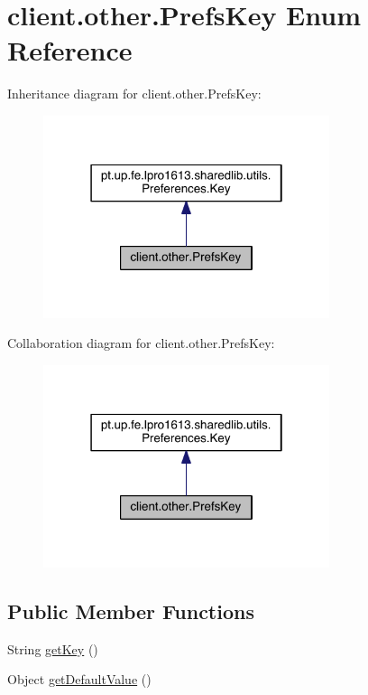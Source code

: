 \hypertarget{enumclient_1_1other_1_1_prefs_key}{}\section{client.\+other.\+Prefs\+Key Enum Reference}
\label{enumclient_1_1other_1_1_prefs_key}


Inheritance diagram for client.\+other.\+Prefs\+Key\+:
\nopagebreak
\begin{figure}[H]
\begin{center}
\leavevmode
\includegraphics[width=238pt]{enumclient_1_1other_1_1_prefs_key__inherit__graph}
\end{center}
\end{figure}


Collaboration diagram for client.\+other.\+Prefs\+Key\+:
\nopagebreak
\begin{figure}[H]
\begin{center}
\leavevmode
\includegraphics[width=238pt]{enumclient_1_1other_1_1_prefs_key__coll__graph}
\end{center}
\end{figure}
\subsection*{Public Member Functions}
\begin{DoxyCompactItemize}
\item 
String \hyperlink{enumclient_1_1other_1_1_prefs_key_a204beaf7ef2607c5ee052bf712d5fc66}{get\+Key} ()
\item 
Object \hyperlink{enumclient_1_1other_1_1_prefs_key_a7d50bec7ffef68ca2b9657cc4a8b271f}{get\+Default\+Value} ()
\end{DoxyCompactItemize}
